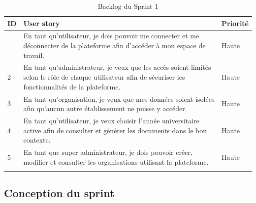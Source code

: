 \begin{longtable}{|>{\centering\arraybackslash}p{1cm}|
                  >{\raggedright\arraybackslash}p{10.4cm}|
                  >{\centering\arraybackslash}p{1.7cm}|}
\hline
\textbf{ID} & \textbf{User story} & \textbf{Priorité} \\
\hline

1 & En tant qu'utilisateur, je dois pouvoir me connecter et me déconnecter de la plateforme afin d'accéder à mon espace de travail. & Haute \\
\hline

2 & En tant qu'administrateur, je veux que les accès soient limités selon le rôle de chaque utilisateur afin de sécuriser les fonctionnalités de la plateforme. & Haute \\
\hline

3 & En tant qu'organisation, je veux que mes données soient isolées afin qu'aucun autre établissement ne puisse y accéder. & Haute \\
\hline

4 & En tant qu'utilisateur, je veux choisir l'année universitaire active afin de consulter et générer les documents dans le bon contexte. & Haute \\
\hline

5 & En tant que super administrateur, je dois pouvoir créer, modifier et consulter les organisations utilisant la plateforme. & Haute \\
\hline

\caption{Backlog du Sprint 1}
\label{tab:backlog_sprint1}

\end{longtable}

\subsection{Conception du sprint}

